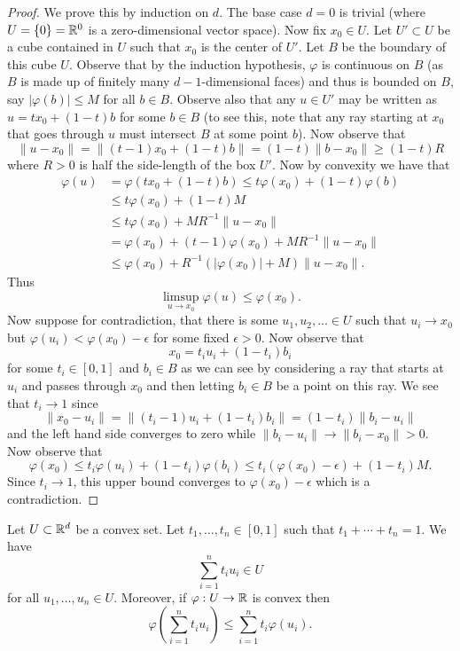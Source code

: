 \documentclass[twoside, a4paper, 10pt]{amsart}
\begin{document}
\begin{proof} We prove this by induction on $d$. The base case $d=0$ is trivial (where $U = \{0 \} = \mathbb{R}^{0}$ is a zero-dimensional vector space). Now fix $x_0 \in U$. Let $U' \subset U$ be a cube contained in $U$ such that $x_0$ is the center of $U'$. Let $B$ be the boundary of this cube $U$. Observe that by the induction hypothesis, $\varphi$ is continuous on $B$ (as $B$ is made up of finitely many $d-1$-dimensional faces) and thus is bounded on $B$, say $|\varphi(b)| \leq M$ for all $b \in B$. Observe also that any $u \in U'$ may be written as $u = tx_0 + (1-t)b$ for some $b \in B$ (to see this, note that any ray starting at $x_0$ that goes through $u$ must intersect $B$ at some point $b$). 
Now observe that $$\|u - x_0\| = \|(t-1)x_0 + (1-t)b\| = (1-t)\|b - x_0\| \geq (1-t)R$$ where $R>0$ is half the side-length of the box $U'$. 
Now by convexity we have that 
\begin{align*} \varphi(u) &= \varphi(tx_0 + (1-t)b) \leq t\varphi(x_0) + (1-t)\varphi(b) \\
&\leq t \varphi(x_0) + (1-t)M \\ 
&\leq t\varphi(x_0) + MR^{-1}\|u - x_0\| \\
&= \varphi(x_0) + (t-1)\varphi(x_0) + MR^{-1} \|u - x_0\| \\
&\leq \varphi(x_0) + R^{-1}(|\varphi(x_0)| + M)\|u-x_0\|. \end{align*}
 Thus $$\limsup_{u \to x_0} \varphi(u) \leq \varphi(x_0).$$ Now suppose for contradiction, that there is some $u_1,u_2, \ldots \in U$ such that $u_i \to x_0$ but $\varphi(u_i) < \varphi(x_0) - \epsilon$ for some fixed $\epsilon > 0$.
 Now observe that $$x_0 = t_iu_i + (1-t_i)b_i$$ for some $t_i \in [0,1]$ and $b_i \in B$ as we can see by considering a ray that starts at $u_i$ and passes through $x_0$ and then letting $b_i \in B$ be a point on this ray.
We see that $t_i \to 1$ since $$\|x_0 - u_i\| = \|(t_i-1)u_i + (1-t_i)b_i \| = (1-t_i)\|b_i - u_i\|$$ and the left hand side converges to zero while $\|b_i - u_i \| \to \|b_i - x_0\| > 0$.
 Now observe that $$\varphi(x_0) \leq t_i \varphi(u_i) + (1-t_i)\varphi(b_i) \leq t_i (\varphi(x_0) - \epsilon) + (1-t_i)M.$$ Since $t_i \to 1$, this upper bound converges to $\varphi(x_0) - \epsilon$ which is a contradiction. \end{proof}

\begin{prop} Let $U \subset \mathbb{R}^d$ be a convex set. Let $t_1, \ldots, t_n \in [0,1]$ such that $t_1 + \cdots + t_n = 1$. We have $$\sum_{i=1}^n t_i u_i \in U$$ for all $u_1, \ldots, u_n \in U$. Moreover, if $\varphi:U \to \mathbb{R}$ is convex then $$\varphi \left(\sum_{i=1}^n t_i u_i \right) \leq \sum_{i=1}^n t_i \varphi(u_i). $$

\end{prop}
\end{document}
